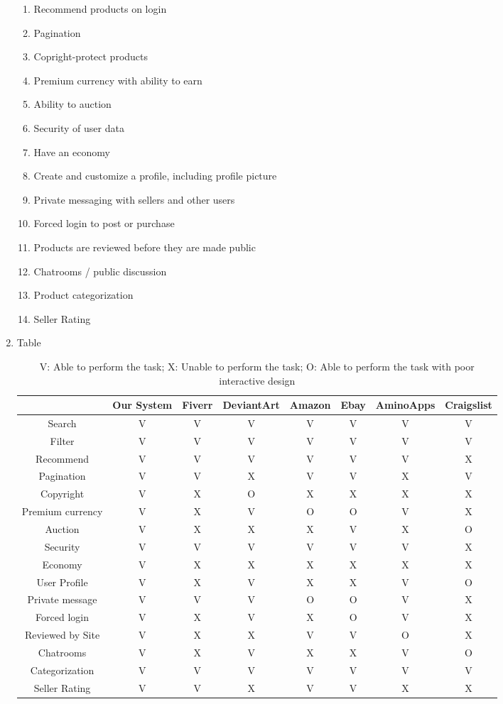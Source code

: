 \documentclass[]{article}
\begin{document}
\begin{enumerate}
\begin{enumerate}
				\item Recommend products on login
				\item Pagination
				\item Copright-protect products
				\item Premium currency with ability to earn
				\item Ability to auction
				\item Security of user data
				\item Have an economy
				\item Create and customize a profile, including profile picture
				\item Private messaging with sellers and other users
				\item Forced login to post or purchase
				\item Products are reviewed before they are made public
				\item Chatrooms / public discussion
				\item Product categorization
				\item Seller Rating
			\end{enumerate}
		\item Table
			\begin{table}[!h]
				\begin{tabular}{|c|c|c|c|c|c|c|c|}
					\hline  & Our System & Fiverr & DeviantArt & Amazon & Ebay & AminoApps & Craigslist \\
					\hline Search & V & V & V & V & V & V & V\\
					\hline Filter & V & V & V & V & V & V & V\\
					\hline Recommend & V & V & V & V & V & V & X\\
					\hline Pagination & V & V & X & V & V & X & V\\
					\hline Copyright & V & X & O & X & X & X & X\\
					\hline Premium currency & V & X & V & O & O & V & X\\
					\hline Auction & V & X & X & X & V & X & O\\
					\hline Security & V & V & V & V & V & V & X\\
					\hline Economy & V & X & X & X & X & X & X\\
					\hline User Profile & V & X & V & X & X & V & O\\
					\hline Private message & V & V & V & O & O & V & X\\
					\hline Forced login & V & X & V & X & O & V & X\\
					\hline Reviewed by Site & V & X & X & V & V & O & X\\
					\hline Chatrooms & V & X & V & X & X & V & O\\
					\hline Categorization & V & V & V & V & V & V & V\\
					\hline Seller Rating & V & V & X & V & V & X & X\\ 
					\hline
				\end{tabular}
			\caption{V: Able to perform the task; X: Unable to perform the task; O: Able to perform the task with poor interactive design}
		\end{table}
	\end{enumerate}
\end{document}
